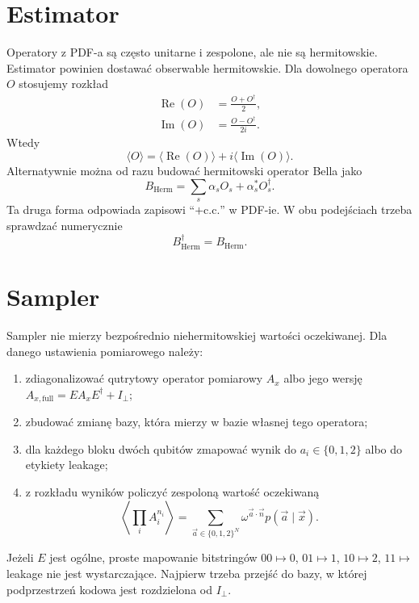 \documentclass[12pt]{article}
\newcommand{\cc}{\mathrm{c.c.}}
\begin{document}
\section{Estimator}

Operatory z PDF-a s\k{a} cz\k{e}sto unitarne i zespolone, ale nie s\k{a} hermitowskie.
Estimator powinien dostawa\'c obserwable hermitowskie. Dla dowolnego operatora $O$
stosujemy rozk\l{}ad
\begin{align}
    \operatorname{Re}(O)&=\frac{O+O^\dagger}{2},\\
    \operatorname{Im}(O)&=\frac{O-O^\dagger}{2i}.
\end{align}
Wtedy
\begin{equation}
    \langle O\rangle
    =
    \langle \operatorname{Re}(O)\rangle
    +
    i\langle \operatorname{Im}(O)\rangle.
\end{equation}
Alternatywnie mo\.zna od razu budowa\'c hermitowski operator Bella jako
\begin{equation}
    B_{\mathrm{Herm}}=\sum_s \alpha_s O_s+\alpha_s^*O_s^\dagger.
\end{equation}
Ta druga forma odpowiada zapisowi ``$+\cc$'' w PDF-ie. W obu podej\'sciach trzeba
sprawdza\'c numerycznie
\begin{equation}
    B_{\mathrm{Herm}}^\dagger=B_{\mathrm{Herm}}.
\end{equation}

\section{Sampler}

Sampler nie mierzy bezpo\'srednio niehermitowskiej warto\'sci oczekiwanej. Dla danego
ustawienia pomiarowego nale\.zy:
\begin{enumerate}
    \item zdiagonalizowa\'c qutrytowy operator pomiarowy $A_x$ albo jego wersj\k{e}
    $A_{x,\mathrm{full}}=E A_x E^\dagger+I_\perp$;
    \item zbudowa\'c zmian\k{e} bazy, kt\'ora mierzy w bazie w\l{}asnej tego operatora;
    \item dla ka\.zdego bloku dw\'och qubit\'ow zmapowa\'c wynik do $a_i\in\{0,1,2\}$
    albo do etykiety leakage;
    \item z rozk\l{}adu wynik\'ow policzy\'c zespolon\k{a} warto\'s\'c oczekiwan\k{a}
    \begin{equation}
        \left\langle \prod_i A_i^{n_i}\right\rangle
        =
        \sum_{\vec{a}\in\{0,1,2\}^N}
        \omega^{\vec{a}\cdot\vec{n}}p(\vec{a}\mid\vec{x}).
    \end{equation}
\end{enumerate}
Je\.zeli $E$ jest og\'olne, proste mapowanie bitstring\'ow
$00\mapsto0$, $01\mapsto1$, $10\mapsto2$, $11\mapsto$ leakage nie jest wystarczaj\k{a}ce.
Najpierw trzeba przej\'s\'c do bazy, w kt\'orej podprzestrze\'n kodowa jest rozdzielona od
$I_\perp$.
\end{document}
